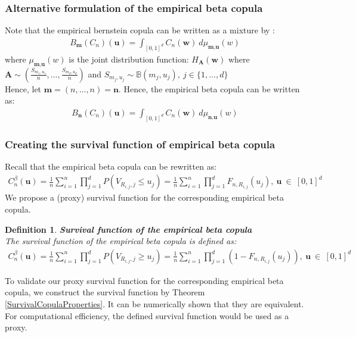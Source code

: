 \documentclass[12pt]{report}
\newtheorem{definition}{Definition}[subsection]
\newcommand{\1}{\mathbf{1}}
\begin{document}
\begin{flushleft}
\newpage
\subsubsection{Alternative formulation of the empirical beta copula}

Note that the empirical bernstein copula can be written as a mixture by \cite{SegersEBC}: 
\begin{align*}
B_{\textbf{m}}(C_{n})(\textbf{u}) = \int_{[0,1]^d} C_{n}(\textbf{w})  \: d\mu_{\textbf{m},\textbf{u}}(w)  
\end{align*}
where $\mu_{\textbf{m},\textbf{u}}(w)$ is the joint distribution function: $H_{\textbf{A}}(\textbf{w})$ where $\textbf{A} \sim \left(\frac{S_{m_{1},u_{1}}}{n}, \dots, \frac{S_{m_{d},u_{d}}}{n}\right)$ and $S_{m_{j},u_{j}} \sim \mathbb{B}(m_{j},u_{j}), \: j \in \{1, \dots, d \}$ \\
\vspace{0.5cm}
Hence, let $\textbf{m} = (n, \dots, n) = \textbf{n}$. Hence, the empirical beta copula can be written as:
\begin{align*}
B_{\textbf{n}}(C_{n})(\textbf{u}) = \int_{[0,1]^d} C_{n}(\textbf{w})  \: d\mu_{\textbf{n},\textbf{u}}(w)  
\end{align*}

\subsubsection{Creating the survival function of empirical beta copula}

Recall that the empirical beta copula can be rewritten as:
\begin{align*}
C^{\beta}_{n}(\textbf{u}) = \frac{1}{n} \sum\limits_{i = 1}^{n} \prod\limits_{j = 1}^{d} P(V_{R_{i,j},j} \le u_{j}) = \frac{1}{n} \sum\limits_{i = 1}^{n} \prod\limits_{j = 1}^{d} F_{n,R_{i,j}}(u_{j}), \: \textbf{u} \: \in \: [0,1]^{d}
\end{align*}
We propose a (proxy) survival function for the corresponding empirical beta copula.
\begin{definition}\label{SurvivalEBC}
\textbf{Survival function of the empirical beta copula} \\
The survival function of the empirical beta copula is defined as:
\begin{align*}
C^{\beta}_{n}(\textbf{u}) = \frac{1}{n} \sum\limits_{i = 1}^{n} \prod\limits_{j = 1}^{d} P(V_{R_{i,j},j} \ge u_{j}) = \frac{1}{n} \sum\limits_{i = 1}^{n} \prod\limits_{j = 1}^{d} (1 - F_{n,R_{i,j}}(u_{j})), \: \textbf{u} \: \in \: [0,1]^{d}
\end{align*}
\end{definition}
To validate our proxy survival function for the corresponding empirical beta copula, we construct the survival function by Theorem \ref{SurvivalCopulaProperties}. It can be numerically shown that they are equivalent. For computational efficiency, the defined survival function would be used as a proxy.


\end{flushleft}
\end{document}
